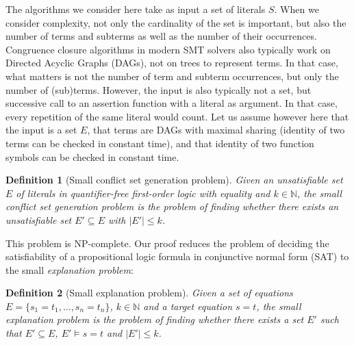 \documentclass{easychair}
\newtheorem{definition}{Definition}
\begin{document}
  The algorithms we consider here take as input a set of literals $S$.  When we consider complexity, not only the cardinality of the set is important, but also the number of terms and subterms as well as the number of their occurrences.  Congruence closure algorithms in modern SMT solvers also typically work on Directed Acyclic Graphs (DAGs), not on trees to represent terms.  In that case, what matters is not the number of term and subterm occurrences, but only the number of (sub)terms.  However, the input is also typically not a set, but successive call to an assertion function with a literal as argument.  In that case, every repetition of the same literal would count.  Let us assume however here that the input is a set $E$, that terms are DAGs with maximal sharing (identity of two terms can be checked in constant time), and that identity of two function symbols can be checked in constant time.



\begin{definition}[Small conflict set generation problem]
Given an unsatisfiable set $E$ of literals in quantifier-free first-order logic
with equality and $k \in \mathbb{N}$, the \emph{small conflict set generation
  problem} is the problem of finding whether there exists an unsatisfiable set
$E' \subseteq E$ with $|E'| \leq k$.
\end{definition}
\noindent This problem is NP-complete.  Our proof reduces the problem
of deciding the satisfiability of a propositional logic formula in conjunctive
normal form (SAT) to the small \emph{explanation problem}:
\begin{definition}[Small explanation problem]
Given a set of equations $E = \{ s_1 = t_1,\ldots, s_n = t_n\}$, $k \in
\mathbb{N}$ and a target equation $s = t$, the \emph{small explanation problem}
is the problem of finding whether there exists a set $E'$ such that $E'
\subseteq E$, $E' \models s = t$ and $|E'| \leq k$.
\end{definition}
\end{document}
